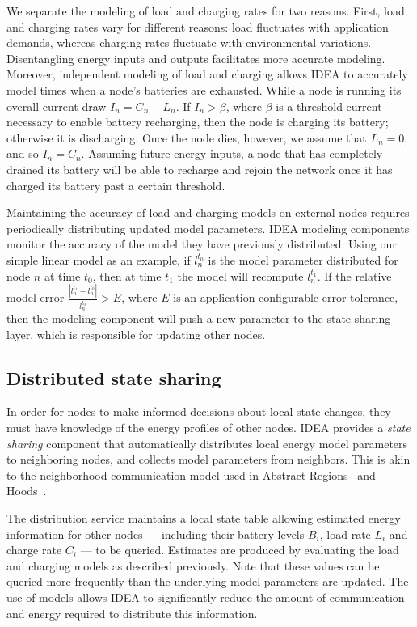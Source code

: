 We separate the modeling of load and charging rates for two reasons. First,
load and charging rates vary for different reasons: load fluctuates with
application demands, whereas charging rates fluctuate with environmental
variations. Disentangling energy inputs and outputs facilitates more accurate
modeling. Moreover, independent modeling of load and charging allows IDEA to
accurately model times when a node's batteries are exhausted. While a node is
running its overall current draw $I_n = C_n - L_n$. If $I_n > \beta$, where
$\beta$ is a threshold current necessary to enable battery recharging, then
the node is charging its battery; otherwise it is discharging. Once the node
dies, however, we assume that $L_n = 0$, and so $I_n = C_n$. Assuming future
energy inputs, a node that has completely drained its battery will be able to
recharge and rejoin the network once it has charged its battery past a
certain threshold.

Maintaining the accuracy of load and charging models on external nodes
requires periodically distributing updated model parameters. 
IDEA modeling components monitor the accuracy of the model they have
previously distributed. Using our simple linear model as an example, if
$l_n^{t_0}$ is the model parameter distributed for node $n$ at time $t_0$,
then at time $t_1$ the model will recompute $l_n^{t_1}$. If the relative
model error $\frac{\left| l_n^{t_1} - l_n^{t_0} \right|}{l_n^{t_0}} >
E$, where $E$ is an application-configurable error tolerance, then the
modeling component will push a new parameter to the state sharing layer,
which is responsible for updating other nodes.

\subsection{Distributed state sharing}

In order for nodes to make informed decisions about local state
changes, they must have knowledge of the energy profiles of other
nodes. IDEA provides a {\em state sharing} component that
automatically distributes local energy model parameters to
neighboring nodes, and collects model parameters from neighbors. This
is akin to the neighborhood communication model used in Abstract
Regions~\cite{regions-nsdi04} and Hoods~\cite{hoods-mobisys}. 

The distribution service maintains a local state table allowing estimated
energy information for other nodes --- including their battery levels
$B_i$, load rate $L_i$ and charge rate $C_i$ --- to be queried.
Estimates are produced by evaluating the load and charging models as
described previously.  Note that these values can be queried more frequently
than the underlying model parameters are updated.  The use of models allows
IDEA to significantly reduce the amount of communication and energy required
to distribute this information.

